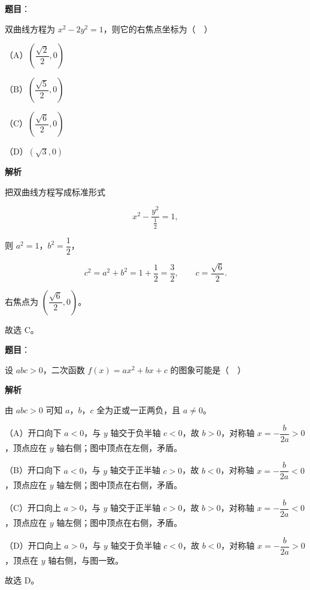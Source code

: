 \begin{answer}

\textbf{题目}：

双曲线方程为 $x^2-2y^2=1$，则它的右焦点坐标为（　）

（A）$\left(\dfrac{\sqrt2}2,0\right)$

（B）$\left(\dfrac{\sqrt5}2,0\right)$

（C）$\left(\dfrac{\sqrt6}2,0\right)$

（D）$(\sqrt3,0)$

\textbf{解析}

把双曲线方程写成标准形式

\nopagebreak[4]
\[x^2-\frac{y^2}{\frac12}=1,\]

则 $a^2=1$，$b^2=\dfrac12$，

\nopagebreak[4]
\[c^2=a^2+b^2=1+\frac12=\frac32,\qquad c=\frac{\sqrt6}2.\]

右焦点为 $\left(\dfrac{\sqrt6}2,0\right)$。

故选 C。


\end{answer}
\begin{answer}

\textbf{题目}：

设 $abc>0$，二次函数 $f(x)=ax^2+bx+c$ 的图象可能是（　）
\nopagebreak[4]
\begin{center}\end{center}
\nopagebreak[4]
\textbf{解析}

由 $abc>0$ 可知 $a$，$b$，$c$ 全为正或一正两负，且 $a\neq0$。

（A）开口向下 $a<0$，与 $y$ 轴交于负半轴 $c<0$，故 $b>0$，对称轴 $x=-\dfrac b{2a}>0$，顶点应在 $y$ 轴右侧；图中顶点在左侧，矛盾。

（B）开口向下 $a<0$，与 $y$ 轴交于正半轴 $c>0$，故 $b<0$，对称轴 $x=-\dfrac b{2a}<0$，顶点应在 $y$ 轴左侧；图中顶点在右侧，矛盾。

（C）开口向上 $a>0$，与 $y$ 轴交于正半轴 $c>0$，故 $b>0$，对称轴 $x=-\dfrac b{2a}<0$，顶点应在 $y$ 轴左侧；图中顶点在右侧，矛盾。

（D）开口向上 $a>0$，与 $y$ 轴交于负半轴 $c<0$，故 $b<0$，对称轴 $x=-\dfrac b{2a}>0$，顶点在 $y$ 轴右侧，与图一致。

故选 D。


\end{answer}
